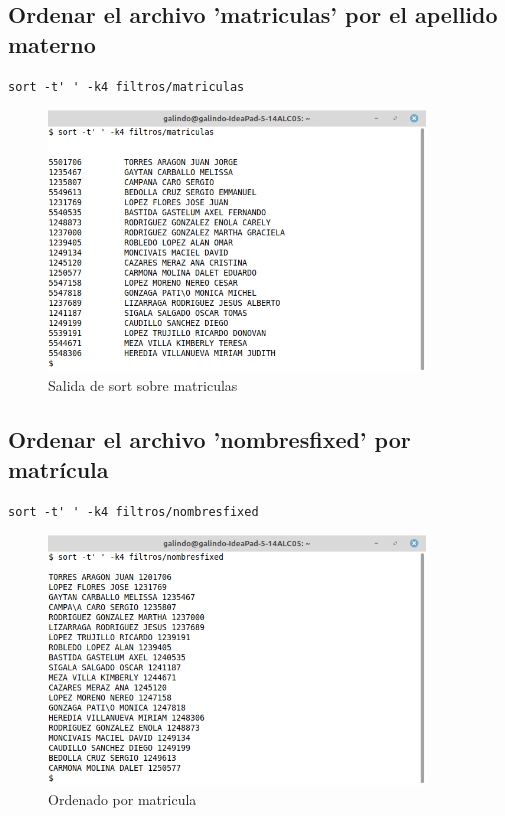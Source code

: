 \documentclass[11pt]{article}
\begin{document}
\pagebreak

\subsection{Ordenar el archivo 'matriculas' por el apellido materno}
\label{sec:org0ab71cd}
\begin{verbatim}
sort -t' ' -k4 filtros/matriculas
\end{verbatim}

\begin{figure}[htbp]
\centering
\includegraphics[width=10cm]{img/a6.png}
\caption{Salida de sort sobre matriculas}
\end{figure}

\cite{sort}

\subsection{Ordenar el archivo 'nombresfixed' por matrícula}
\label{sec:org8dacc69}
\begin{verbatim}
sort -t' ' -k4 filtros/nombresfixed
\end{verbatim}

\begin{figure}[htbp]
\centering
\includegraphics[width=10cm]{img/a7.png}
\caption{Ordenado por matricula}
\end{figure}
\end{document}
